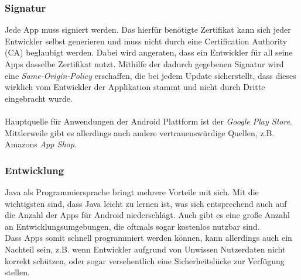 	\subsubsection{Signatur}
	Jede App muss signiert werden. Das hierfür benötigte Zertifikat kann sich jeder Entwickler selbst generieren und muss nicht durch eine Certification Authority (CA) beglaubigt werden. Dabei wird angeraten, dass ein Entwickler für all seine Apps dasselbe Zertifikat nutzt. Mithilfe der dadurch gegebenen Signatur wird eine \textit{Same-Origin-Policy} erschaffen, die bei jedem Update sicherstellt, dass dieses wirklich vom Entwickler der Applikation stammt und nicht durch Dritte eingebracht wurde.\\\\
	Hauptquelle für Anwendungen der Android Plattform ist der \textit{Google Play Store}. Mittlerweile gibt es allerdings auch andere vertrauenswürdige Quellen, z.B. Amazons \textit{App Shop}.
	
	\subsubsection{Entwicklung}
	Java als Programmiersprache bringt mehrere Vorteile mit sich. Mit die wichtigsten sind, dass Java leicht zu lernen ist, was sich entsprechend auch auf die Anzahl der Apps für Android niederschlägt. Auch gibt es eine große Anzahl an Entwicklungsumgebungen, die oftmals sogar kostenlos nutzbar sind.\\
	Dass Apps somit schnell programmiert werden können, kann allerdings auch ein Nachteil sein, z.B. wenn Entwickler aufgrund von Unwissen Nutzerdaten nicht korrekt schützen, oder sogar versehentlich eine Sicherheitslücke zur Verfügung stellen.